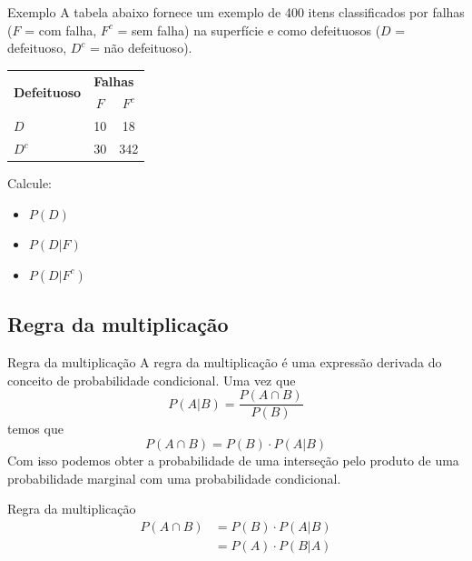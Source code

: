 \documentclass[10pt]{beamer}\usepackage[]{graphicx}\usepackage[]{color}
\theoremstyle{definition}
\begin{document}
\begin{frame}{Exemplo}
  A tabela abaixo fornece um exemplo de 400 itens classificados por
  falhas ($F$ = com falha, $F^c$ = sem falha) na superfície e como
  defeituosos ($D$ = defeituoso, $D^c$ = não defeituoso).
  \begin{table}[!h]
    \centering
    \begin{tabular}{lcc}
      \hline
      \multirow{2}{*}{\textbf{Defeituoso}}
      & \multicolumn{2}{l}{\textbf{Falhas}} \\
      \cline{2-3}
                & $F$         & $F^c$       \\
      \hline
      $D$      & 10           & 18           \\
      $D^c$     & 30           & 342           \\
      \hline
    \end{tabular}
  \end{table}
  Calcule:
  \begin{itemize}
  \item $P(D)$
  \item $P(D|F)$
  \item $P(D|F^c)$
  \end{itemize}
\end{frame}

\subsection{Regra da multiplicação}

\begin{frame}[fragile]{Regra da multiplicação}
  A regra da multiplicação é uma expressão derivada do conceito de
  probabilidade condicional. Uma vez que
  \begin{equation*}
    P(A|B) = \frac{P(A\cap B)}{P(B)}
  \end{equation*}
  temos que
  \begin{equation*}
    P(A\cap B) = P(B) \cdot P(A|B)
  \end{equation*}
  Com isso podemos obter a probabilidade de uma interseção pelo produto
  de uma probabilidade marginal com uma probabilidade condicional.
  \begin{block}{Regra da multiplicação}
    \begin{align*}
      P(A\cap B) &= P(B) \cdot P(A|B) \\
      &= P(A) \cdot P(B|A)
    \end{align*}
  \end{block}
\end{frame}
\end{document}
